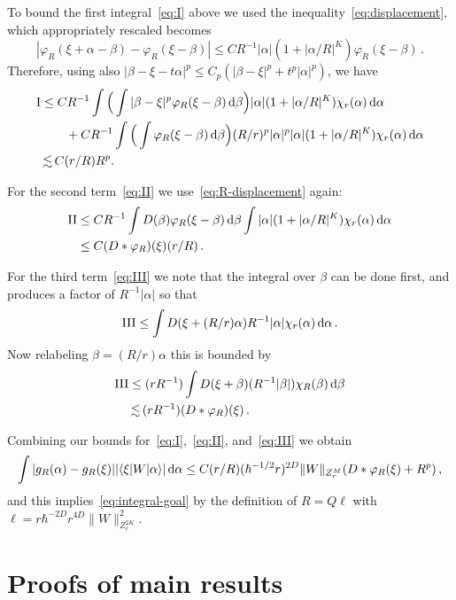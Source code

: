 \documentclass[11pt]{amsart}
\newcommand{\diff}{\mathop{}\!\mathrm{d}}
\def\lsim{{\,\lesssim\,}}
\def\Braket#1{\!\mathinner{\langle{#1}\rangle}\!}
\numberwithin{equation}{section}
\begin{document}
To bound the first integral~\eqref{eq:I} above we used the inequality~\eqref{eq:displacement}, which appropriately rescaled becomes
\begin{equation}
\label{eq:R-displacement}
|\varphi_R(\xi +\alpha-\beta) - \varphi_R(\xi-\beta)|
\leq C R^{-1} |\alpha| (1+|\alpha/R|^K) \varphi_R(\xi-\beta)\,.
\end{equation}
Therefore, using also $|\beta-\xi-t\alpha|^p \leq C_p( |\beta-\xi|^p + t^p|\alpha|^p)$, we
have \begin{align*}
{\rm I} &\leq
C R^{-1} \int \Big(\int |\beta-\xi|^p \varphi_R(\xi-\beta) \diff \beta\Big)|\alpha| (1+|\alpha/R|^K)
\chi_r(\alpha)\diff \alpha \\
&\qquad +
C R^{-1} \int \Big(\int \varphi_R(\xi-\beta) \diff \beta\Big)(R/r)^p |\alpha|^p |\alpha| (1+|\alpha/R|^K)
\chi_r(\alpha)\diff \alpha \\
&\lsim C(r/R) R^p.
\end{align*}

For the second term~\eqref{eq:II} we use~\eqref{eq:R-displacement} again:
\begin{align*}
{\rm II} &\leq C R^{-1} \int D(\beta) \varphi_R(\xi-\beta) \diff \beta
\int
|\alpha| (1+|\alpha/R|^K) \chi_r(\alpha)
\diff \alpha \\
&\leq C (D\ast \varphi_R)(\xi) (r/R)\,.
\end{align*}

For the third term~\eqref{eq:III} we note that the integral over $\beta$ can be done first, and produces a factor of $R^{-1}|\alpha|$ so that
\[
{\rm III} \leq \int D(\xi+(R/r)\alpha) R^{-1} |\alpha| \chi_r(\alpha) \diff\alpha\,.
\]
Now relabeling $\beta =(R/r)\alpha$ this is bounded by
\begin{align}
{\rm III}
&\leq (rR^{-1}) \int D(\xi+\beta) (R^{-1} |\beta|) \chi_R(\beta) \diff\beta \\
&\lsim (rR^{-1}) (D\ast \varphi_R)(\xi)\,.
\end{align}


Combining our bounds for~\eqref{eq:I},~\eqref{eq:II}, and~\eqref{eq:III} we obtain
\[
\int |g_R(\alpha)-g_R(\xi)| |\Braket{\xi|W|\alpha}| \diff \alpha
\leq C (r/R) (\hbar^{-1/2}r)^{2D} \|W\|_{Z^M_r} (D\ast \varphi_R(\xi) + R^p)\,,
\]
and this implies~\eqref{eq:integral-goal} by the definition of $R=Q\ell$ with
$\ell = r \hbar^{-2D}r^{4D} \|W\|_{Z^{2K}_r}^2$.



\section{Proofs of main results}
\label{sec:proof}
\end{document}
